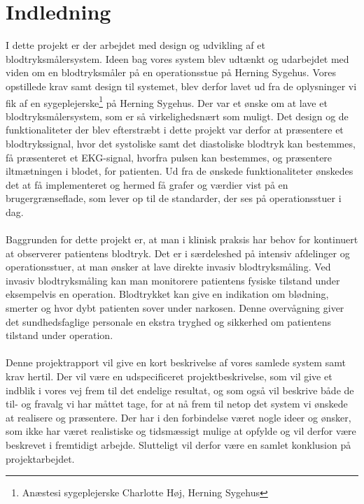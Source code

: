 \chapter{Indledning}
I dette projekt er der arbejdet med design og udvikling af et blodtryksmålersystem. Ideen bag vores system blev udtænkt og udarbejdet med viden om en blodtryksmåler på en operationsstue på Herning Sygehus. Vores opstillede krav samt design til systemet, blev derfor lavet ud fra de oplysninger vi fik af en sygeplejerske\footnote{Anæstesi sygeplejerske Charlotte Høj, Herning Sygehus} på Herning Sygehus. Der var et ønske om at lave et blodtryksmålersystem, som er så virkelighedsnært som muligt. Det design og de funktionaliteter der blev efterstræbt i dette projekt var derfor at præsentere et blodtrykssignal, hvor det systoliske samt det diastoliske blodtryk kan bestemmes, få præsenteret et EKG-signal, hvorfra pulsen kan bestemmes, og præsentere iltmætningen i blodet, for patienten. Ud fra de ønskede funktionaliteter ønskedes det at få implementeret og hermed få grafer og værdier vist på en brugergrænseflade, som lever op til de standarder, der ses på operationsstuer i dag. \\
\\
Baggrunden for dette projekt er, at man i klinisk praksis har behov for kontinuert at observerer patientens blodtryk. Det er i særdeleshed på intensiv afdelinger og operationsstuer, at man ønsker at lave direkte invasiv blodtryksmåling. Ved invasiv blodtryksmåling kan man monitorere patientens fysiske tilstand under eksempelvis en operation. Blodtrykket kan give en indikation om blødning, smerter og hvor dybt patienten sover under narkosen. Denne overvågning giver det sundhedsfaglige personale en ekstra tryghed og sikkerhed om patientens tilstand under operation. \\
\\
Denne projektrapport vil give en kort beskrivelse af vores samlede system samt krav hertil. Der vil være en udspecificeret projektbeskrivelse, som vil give et indblik i vores vej frem til det endelige resultat, og som også vil beskrive både de til- og fravalg vi har måttet tage, for at nå frem til netop det system vi ønskede at realisere og præsentere. Der har i den forbindelse været nogle ideer og ønsker, som ikke har været realistiske og tidsmæssigt mulige at opfylde og vil derfor være beskrevet i fremtidigt arbejde. Slutteligt vil derfor være en samlet konklusion på projektarbejdet.
